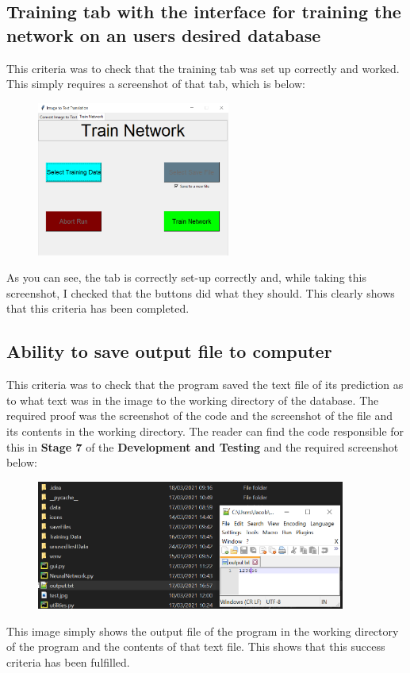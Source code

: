 \documentclass{report}
\begin{document}
\subsection{Training tab with the interface for training the network on an users desired database}
This criteria was to check that the training tab was set up correctly and worked. This simply requires a  screenshot of that tab, which is below:
\begin{figure}[H]
    \centering
    \includegraphics[width=2.5in]{Images/Evaluation/Success Criteria Proof/Train Network Tab screenshot.png}
\end{figure}
\noindent As you can see, the tab is correctly set-up correctly and, while taking this screenshot, I checked that the buttons did what they should. This clearly shows that this criteria has been completed.
\subsection{Ability to save output file to computer}
This criteria was to check that the program saved the text file of its prediction as to what text was in the image to the working directory of the database. The required proof was the screenshot of the code and the screenshot of the file and its contents in the working directory. The reader can find the code responsible for this in \textbf{Stage 7} of the \textbf{Development and Testing} and the required screenshot below:
\begin{figure}[H]
    \centering
    \includegraphics[width=4in]{Images/Evaluation/Success Criteria Proof/Translation Output Screenshot.png}
\end{figure}
\noindent This image simply shows the output file of the program in the working directory of the program and the contents of that text file. This shows that this success criteria has been fulfilled.
\end{document}
